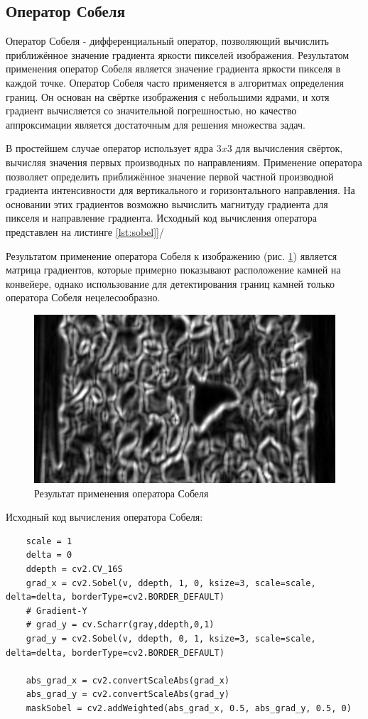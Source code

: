\documentclass[times]{itmo-student-thesis}
\begin{document}
\subsection{Оператор Собеля}\label{Sobel}

Оператор Собеля - дифференциальный оператор, позволяющий вычислить приближённое значение градиента яркости пикселей изображения. Результатом применения оператор Собеля является значение градиента яркости пикселя в каждой точке. Оператор Собеля часто применяется в алгоритмах определения границ. Он основан на свёртке изображения с небольшими ядрами, и хотя градиент вычисляется со значительной погрешностью, но качество аппроксимации является достаточным для решения множества задач. 

В простейшем случае оператор  использует ядра $3x3$ для вычисления свёрток, вычисляя значения первых производных по направлениям. Применение оператора позволяет  определить приближённое значение первой частной производной градиента интенсивности для вертикального и горизонтального направления. На основании этих градиентов возможно вычислить магнитуду градиента для пикселя и направление градиента.  Исходный код вычисления оператора представлен на листинге \ref{lst:sobel}]/

Результатом применение оператора Собеля к изображению (рис. \ref{fig:sobel}) является матрица градиентов, которые примерно показывают расположение камней на конвейере, однако использование для детектирования границ камней только оператора Собеля нецелесообразно. 

\begin{figure}
	\centering
	\includegraphics[width=0.7\linewidth]{images/sobel}
	\caption{Результат применения оператора Собеля}
	\label{fig:sobel}
\end{figure}

\begin{algorithm}[h!]
	\caption{Исходный код вычисления оператора Собеля:}\label{lst:sobel}
	\begin{lstlisting}
	scale = 1
	delta = 0
	ddepth = cv2.CV_16S
	grad_x = cv2.Sobel(v, ddepth, 1, 0, ksize=3, scale=scale, delta=delta, borderType=cv2.BORDER_DEFAULT)
	# Gradient-Y
	# grad_y = cv.Scharr(gray,ddepth,0,1)
	grad_y = cv2.Sobel(v, ddepth, 0, 1, ksize=3, scale=scale, delta=delta, borderType=cv2.BORDER_DEFAULT)
	
	abs_grad_x = cv2.convertScaleAbs(grad_x)
	abs_grad_y = cv2.convertScaleAbs(grad_y)
	maskSobel = cv2.addWeighted(abs_grad_x, 0.5, abs_grad_y, 0.5, 0)
	\end{lstlisting}
\end{algorithm}
\end{document}
